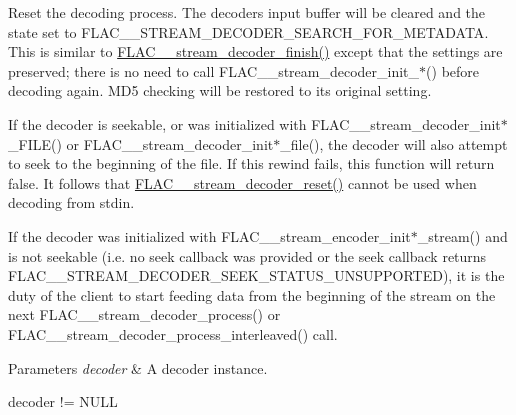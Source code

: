 Reset the decoding process. The decoder\textquotesingle{}s input buffer will be cleared and the state set to {\ttfamily F\+L\+A\+C\+\_\+\+\_\+\+S\+T\+R\+E\+A\+M\+\_\+\+D\+E\+C\+O\+D\+E\+R\+\_\+\+S\+E\+A\+R\+C\+H\+\_\+\+F\+O\+R\+\_\+\+M\+E\+T\+A\+D\+A\+TA}. This is similar to \hyperlink{group__flac__stream__decoder_gaa51bb38f762ee11b320a0839f165c5ce}{F\+L\+A\+C\+\_\+\+\_\+stream\+\_\+decoder\+\_\+finish()} except that the settings are preserved; there is no need to call F\+L\+A\+C\+\_\+\+\_\+stream\+\_\+decoder\+\_\+init\+\_\+$\ast$() before decoding again. M\+D5 checking will be restored to its original setting.

If the decoder is seekable, or was initialized with F\+L\+A\+C\+\_\+\+\_\+stream\+\_\+decoder\+\_\+init$\ast$\+\_\+\+F\+I\+LE() or F\+L\+A\+C\+\_\+\+\_\+stream\+\_\+decoder\+\_\+init$\ast$\+\_\+file(), the decoder will also attempt to seek to the beginning of the file. If this rewind fails, this function will return {\ttfamily false}. It follows that \hyperlink{group__flac__stream__decoder_ga2342cf4f3caf9ad20fca1373aaea0c27}{F\+L\+A\+C\+\_\+\+\_\+stream\+\_\+decoder\+\_\+reset()} cannot be used when decoding from {\ttfamily stdin}.

If the decoder was initialized with F\+L\+A\+C\+\_\+\+\_\+stream\+\_\+encoder\+\_\+init$\ast$\+\_\+stream() and is not seekable (i.\+e. no seek callback was provided or the seek callback returns {\ttfamily F\+L\+A\+C\+\_\+\+\_\+\+S\+T\+R\+E\+A\+M\+\_\+\+D\+E\+C\+O\+D\+E\+R\+\_\+\+S\+E\+E\+K\+\_\+\+S\+T\+A\+T\+U\+S\+\_\+\+U\+N\+S\+U\+P\+P\+O\+R\+T\+ED}), it is the duty of the client to start feeding data from the beginning of the stream on the next F\+L\+A\+C\+\_\+\+\_\+stream\+\_\+decoder\+\_\+process() or F\+L\+A\+C\+\_\+\+\_\+stream\+\_\+decoder\+\_\+process\+\_\+interleaved() call.


\begin{DoxyParams}{Parameters}
{\em decoder} & A decoder instance.  
\begin{DoxyCode}
decoder != NULL 
\end{DoxyCode}
 \\
\hline
\end{DoxyParams}

